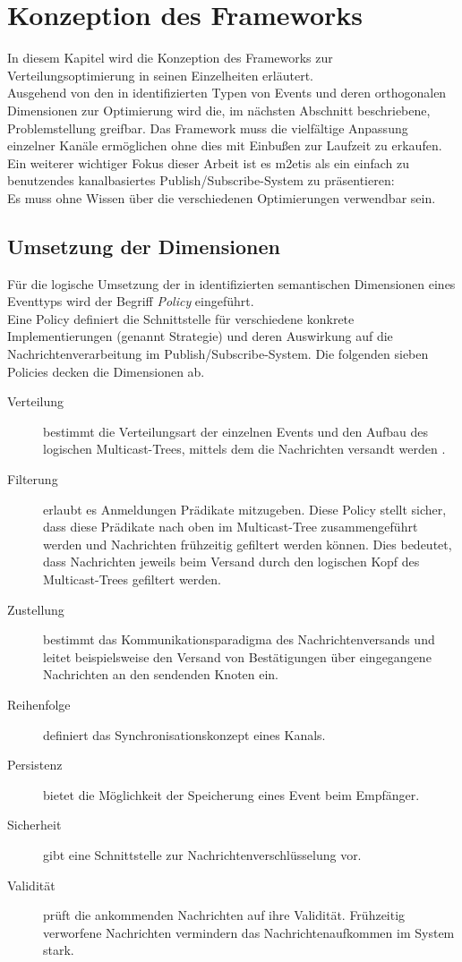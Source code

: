 \chapter{Konzeption des Frameworks}
\label{chap:konzeption_pubsub}
In diesem Kapitel wird die Konzeption des Frameworks zur Verteilungsoptimierung in seinen Einzelheiten erläutert.\\
Ausgehend von den in \cite{Fischer2010a} identifizierten Typen von Events und deren orthogonalen Dimensionen zur Optimierung wird die, im nächsten Abschnitt beschriebene, Problemstellung greifbar. Das Framework muss die vielfältige Anpassung einzelner Kanäle ermöglichen ohne dies mit Einbußen zur Laufzeit zu erkaufen. Ein weiterer wichtiger Fokus dieser Arbeit ist es \ac{m2etis} als ein einfach zu benutzendes kanalbasiertes Publish/Subscribe-System zu präsentieren:\\
Es muss ohne Wissen über die verschiedenen Optimierungen verwendbar sein.



\section{Umsetzung der Dimensionen}
Für die logische Umsetzung der in \cite{Fischer2010Event} identifizierten semantischen Dimensionen eines Eventtyps wird der Begriff \emph{Policy} eingeführt.\\
Eine Policy definiert die Schnittstelle für verschiedene konkrete Implementierungen (genannt Strategie) und deren Auswirkung auf die Nachrichtenverarbeitung im Publish/Subscribe-System. Die folgenden sieben Policies decken die Dimensionen ab.

\begin{description}
\item[Verteilung] bestimmt die Verteilungsart der einzelnen Events und den Aufbau des logischen Multicast-Trees, mittels dem die Nachrichten versandt werden \cite{KostasKatrinis2005}.
\item[Filterung] erlaubt es Anmeldungen Prädikate mitzugeben. Diese Policy stellt sicher, dass diese Prädikate nach oben im Multicast-Tree zusammengeführt werden und Nachrichten frühzeitig gefiltert werden können. Dies bedeutet, dass Nachrichten jeweils beim Versand durch den logischen Kopf des Multicast-Trees gefiltert werden.
\item[Zustellung] bestimmt das Kommunikationsparadigma des Nachrichtenversands und leitet beispielsweise den Versand von Bestätigungen über eingegangene Nachrichten an den sendenden Knoten ein.
\item[Reihenfolge] definiert das Synchronisationskonzept eines Kanals.
\item[Persistenz] bietet die Möglichkeit der Speicherung eines Event beim Empfänger.
\item[Sicherheit] gibt eine Schnittstelle zur Nachrichtenverschlüsselung vor.
\item[Validität] prüft die ankommenden Nachrichten auf ihre Validität. Frühzeitig verworfene Nachrichten vermindern das Nachrichtenaufkommen im System stark.
\end{description}

